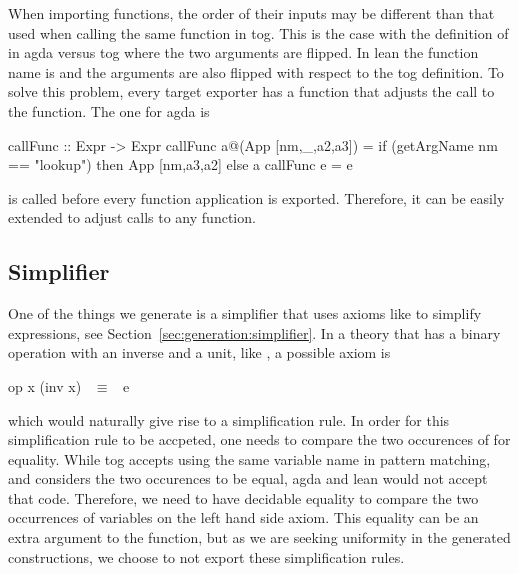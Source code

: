 \begin{comment}
In agda, \lstmath{Fin} is defined as 
\begin{agdacode}
data Fin : ~$\mathbb{N}$~ ~$\rightarrow$~ Set where
zero : {n : ~$\mathbb{N}$~} ~$\rightarrow$~ Fin (suc n)
suc  : {n : ~$\mathbb{N}$~} (i : Fin n) ~$\rightarrow$~ Fin (suc n)
\end{agdacode}
\end{comment} 
When importing functions, the order of their inputs may be different than that used when calling the same function in tog. This is the case with the definition of  in agda versus tog where the two arguments are flipped. In lean the function name is  and the arguments are also flipped with respect to the tog definition. To solve this problem, every target exporter has a function  that adjusts the call to the function. The one for agda is 
\begin{hscode}
callFunc :: Expr -> Expr
callFunc a@(App [nm,_,a2,a3]) =
  if (getArgName nm == "lookup") then App [nm,a3,a2] else a
callFunc e = e
\end{hscode}
 is called before every function application is exported. Therefore, it can be easily extended to adjust calls to any function. 

\subsection{Simplifier}
One of the things we generate is a simplifier that uses axioms like  to simplify expressions, see Section~\ref{sec:generation:simplifier}. 
In a theory that has a binary operation with an inverse and a unit, like , a possible axiom is  
\begin{agdacode}
op x (inv x) ~$\equiv$~ e 
\end{agdacode}
which would naturally give rise to a simplification rule. In order for this simplification rule to be accpeted, one needs to compare the two occurences of  for equality. While tog accepts using the same variable name in pattern matching, and considers the two occurences to be equal, agda and lean would not accept that code. Therefore, we need to have decidable equality to compare the two occurrences of variables on the left hand side axiom. This equality can be an extra argument to the function, but as we are seeking uniformity in the generated constructions, we choose to not export these simplification rules. 

